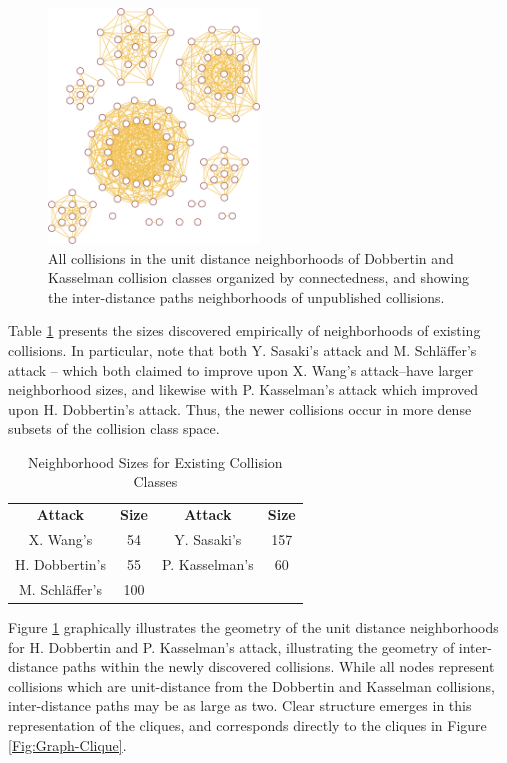 \documentclass[conference]{IEEEtran}
\begin{document}
\begin{figure}
\begin{center}
\includegraphics[width=0.5\textwidth]{Figs/graph-neighborhood-crop.pdf}
\caption{All collisions in the unit distance neighborhoods of
  Dobbertin and Kasselman collision classes
  organized by connectedness, and showing the inter-distance
  paths neighborhoods of unpublished collisions.}
\label{Fig:Graph-Neighborhood}
\end{center}
\end{figure}

Table \ref{table:neighborhood} presents the sizes discovered empirically of neighborhoods
of existing collisions. In particular, note that both Y. Sasaki's attack and
M. Schl{\"a}ffer's attack -- which both claimed to improve upon X. Wang's
attack--have larger neighborhood sizes, and likewise with P. Kasselman's
attack which improved upon H. Dobbertin's attack. Thus, the newer collisions
occur in more dense subsets of the collision class space.

\begin{table}
    \caption{Neighborhood Sizes for Existing Collision Classes}
    \label{table:neighborhood}
    \begin{tabular}{c c c c}
        \textbf{Attack} & \textbf{Size} & \textbf{Attack} & \textbf{Size} \\
        X. Wang's & 54 & Y. Sasaki's & 157 \\
        H. Dobbertin's & 55 & P. Kasselman's & 60 \\
        M. Schl{\"a}ffer's & 100 & & \\
    \end{tabular}
\end{table}

Figure \ref{Fig:Graph-Neighborhood} graphically illustrates the
geometry of the unit distance neighborhoods for H. Dobbertin and
P. Kasselman's attack, illustrating the geometry of inter-distance
paths within the newly discovered collisions.  While all nodes
represent collisions which are unit-distance from the Dobbertin and
Kasselman collisions, inter-distance paths may be as large as two.
Clear structure emerges in this representation of the cliques, and
corresponds directly to the cliques in Figure \ref{Fig:Graph-Clique}.
\end{document}
